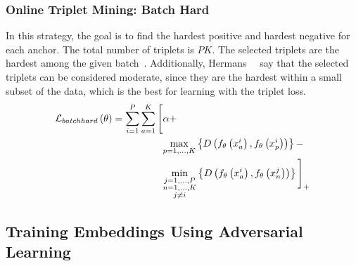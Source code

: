 \subsubsection{Online Triplet Mining: Batch Hard}

In this strategy, the goal is to find the hardest positive and hardest negative for each anchor. The total number of triplets is $PK$. The selected triplets are the hardest among the given batch~\cite{hermans2017triplet}. Additionally, Hermans~\etal{}~\cite{hermans2017triplet} say that the selected triplets can be considered moderate, since they are the hardest within a small subset of the data, which is the best for learning with the triplet loss.
\begin{equation}
    \begin{aligned}
        {\mathcal{L}_{batchhard}} \left( \theta \right) =
        \sum_{i = 1}^P
        \sum_{a = 1}^K
        \Bigg[
         & \alpha +                            \\
         & \underset{p = 1, \dots, K} {\max}
        \left\{ {
            {D} \left( 
                {f_\theta} \left( x_a^i \right),
                {f_\theta} \left( x_p^i \right)
             \right)
        } \right\} -                                    \\
         & \underset{\substack{j = 1, \dots, P \\n = 1, \dots, K\\j \neq i}} {\min}
        \left\{ {
            {D} \left( 
                {f_\theta} \left( x_a^i \right),
                {f_\theta} \left( x_n^j \right)
             \right)
        } \right\}
        {\Bigg]}_{+}
    \end{aligned}
\end{equation}

\subsection{Training Embeddings Using Adversarial Learning}
\label{ssec:TrainingEmbeddingsAdversarialLearning}

